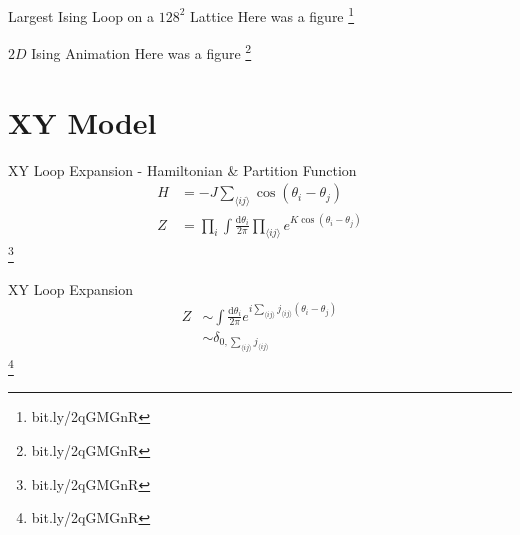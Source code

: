 \documentclass[10pt]{beamer}
\newcommand\blfootnote[1]{%
  \begingroup
  \renewcommand\thefootnote{}\footnote{#1}%
  \addtocounter{footnote}{-1}%
  \endgroup
}
\begin{document}
\begin{frame}{Largest Ising Loop on a $128^2$ Lattice}
            Here was a figure
\blfootnote{bit.ly/2qGMGnR}
\end{frame}

\begin{frame}{$2D$ Ising Animation}
        Here was a figure
     \blfootnote{bit.ly/2qGMGnR}
\end{frame}

\section{XY Model}

\begin{frame}{XY Loop Expansion - Hamiltonian \& Partition Function}
    \begin{align*}
        H &= - J \sum_{\langle ij \rangle} \cos(\theta_i - \theta_j) \\
        Z &= \prod_i \int \frac{\mathrm d \theta_i}{2 \pi} \prod_{\langle ij \rangle} e^{K  \cos(\theta_i - \theta_j)}
    \end{align*}
    \blfootnote{bit.ly/2qGMGnR}
\end{frame}

\begin{frame}{XY Loop Expansion}
    \begin{align*}
        Z &\sim \int \frac{\mathrm d \theta_i}{2 \pi} e^{i \sum_{\langle ij \rangle} j_{\langle ij \rangle} (\theta_i - \theta_j)} \\
        & \sim \delta_{0, \sum_{\langle ij \rangle} j_{\langle ij \rangle}}
    \end{align*}
    \blfootnote{bit.ly/2qGMGnR}
\end{frame}
\end{document}
